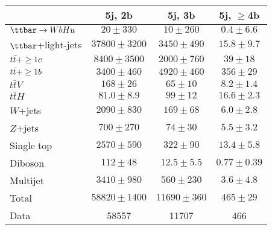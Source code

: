 \begin{table}[htbp]
\begin{center}
\begin{tabular}{l*{3}{c}}
\hline\hline
 & 5j, 2b & 5j, 3b & 5j, $\geq$4b \\
\hline
$\Hu$  &   $ 20 \pm 330 $ &   $ 10 \pm 260 $ &   $ 0.4 \pm 6.6 $ \\ 
\hline
$\ttbar$+light-jets  &   $ 37800 \pm 3200 $ &   $ 3450 \pm 490 $ &   $ 15.8 \pm 9.7 $ \\ 
$t\bar{t}+\geq1c$  &   $ 8400 \pm 3500 $ &   $ 2000 \pm 760 $ &   $ 39 \pm 18 $ \\ 
$t\bar{t}+\geq1b$  &   $ 3400 \pm 460 $ &   $ 4920 \pm 460 $ &   $ 356 \pm 29 $ \\ 
$t\bar{t}V$  &   $ 168 \pm 26 $ &   $ 65 \pm 10 $ &   $ 8.2 \pm 1.4 $ \\ 
$t\bar{t}H$  &   $ 81.0 \pm 8.9 $ &   $ 99 \pm 12 $ &   $ 16.6 \pm 2.3 $ \\ 
$W$+jets  &   $ 2090 \pm 830 $ &   $ 169 \pm 68 $ &   $ 6.0 \pm 2.8 $ \\ 
$Z$+jets  &   $ 700 \pm 270 $ &   $ 74 \pm 30 $ &   $ 5.5 \pm 3.2 $ \\ 
Single top  &   $ 2570 \pm 590 $ &   $ 322 \pm 90 $ &   $ 13.4 \pm 5.8 $ \\ 
Diboson  &   $ 112 \pm 48 $ &   $ 12.5 \pm 5.5 $ &   $ 0.77 \pm 0.39 $ \\ 
Multijet  &   $ 3410 \pm 980 $ &   $ 560 \pm 230 $ &   $ 3.6 \pm 4.8 $ \\ 
\hline
Total & $ 58820 \pm 1400 $ &   $ 11690 \pm 360 $ &   $ 465 \pm 29 $ \\ 
\hline
Data & 58557  & 11707  & 466  \\ 
\hline\hline      
\end{tabular}
\vspace{0.2cm}


\end{center}
\end{table}
